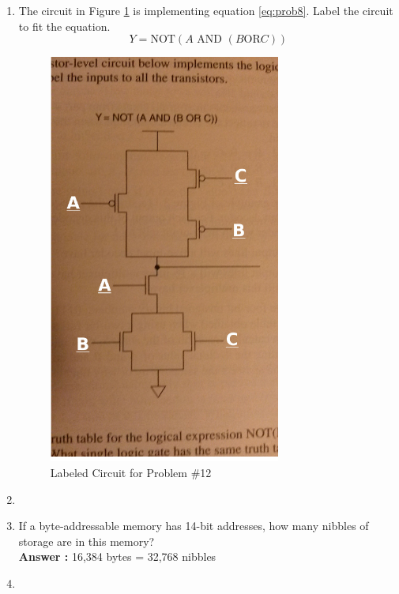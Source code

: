 \documentclass[a4paper,11pt]{article}
\begin{document}
\begin{enumerate}
\item The circuit in Figure \ref{fig:prob8} is implementing equation \eqref{eq:prob8}. Label the circuit to fit the equation.
\begin{equation} \label{eq:prob8} Y = \text{NOT}(A \text{ AND } (B \text{OR} C))
\end{equation}
\begin{figure}[h!]
   \centering
     \includegraphics[width=3in]{prob8}
   \caption{Labeled Circuit for Problem \#12}
   \label{fig:prob8}
\end{figure}  

\item 

\item If a byte-addressable memory has 14-bit addresses, how many nibbles of storage are in this memory? \\
\textbf{Answer :} 16,384 bytes = 32,768 nibbles

\item 

\end{enumerate}
\end{document}
